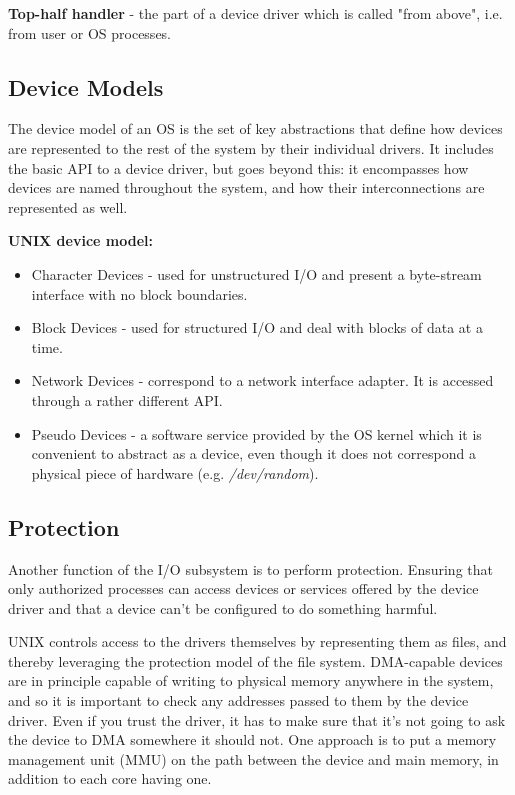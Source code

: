 \textbf{Top-half handler} - the part of a device driver which is called "from above", i.e. from user or OS processes.


\subsection{Device Models}

The device model of an OS is the set of key abstractions that define how devices are represented to the rest of the system by their individual drivers. It includes the basic API to a device driver, but goes beyond this: it encompasses how devices are named throughout the system, and how their interconnections are represented as well. \medskip

\textbf{UNIX device model:}
\begin{itemize}
	\item Character Devices - used for unstructured I/O and present a byte-stream interface with no block boundaries.
	\item Block Devices - used for structured I/O and deal with blocks of data at a time.
	\item Network Devices - correspond to a network interface adapter. It is accessed through a rather different API.
	\item Pseudo Devices - a software service provided by the OS kernel which it is convenient to abstract as a device, even though it does not correspond a physical piece of hardware (e.g. \textit{/dev/random}).
\end{itemize}


\subsection{Protection}

Another function of the I/O subsystem is to perform protection. Ensuring that only authorized processes can access devices or services offered by the device driver and that a device can't be configured to do something harmful.\medskip

UNIX controls access to the drivers themselves by representing them as files, and thereby leveraging the protection model of the file system. DMA-capable devices are in principle capable of writing to physical memory anywhere in the system, and so it is important to check any addresses passed to them by the device driver. Even if you trust the driver, it has to make sure that it’s not going to ask the device to DMA somewhere it should not. One approach is to put a memory management unit (MMU) on the path between the device and main memory, in addition to each core having one.
